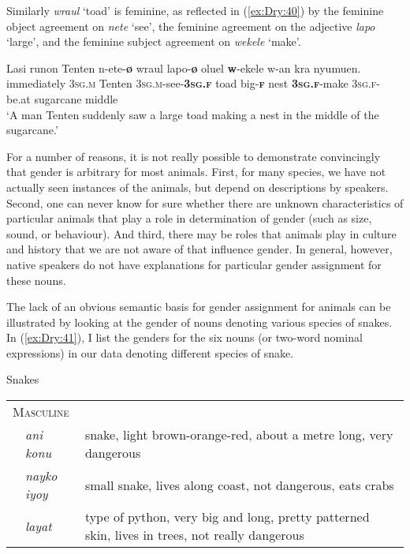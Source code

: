 \documentclass[output=collectionpaper]{langsci/langscibook}
\begin{document}
Similarly \textit{wraul} `toad' is feminine, as reflected in (\ref{ex:Dry:40}) by the feminine object agreement on \textit{nete} `see', the feminine agreement on the adjective \textit{lapo} `large', and the feminine subject agreement on \textit{wekele} `make'.

\ea \label{ex:Dry:40}
\gll Lasi	runon	Tenten	n-ete-\textbf{ø}	wraul lapo-\textbf{ø}	oluel	\textbf{w}-ekele	w-an kra	nyumuen.\\
immediately \textsc{3sg.m} Tenten \textsc{3sg.m}-see-\textbf{\textsc{3sg.f}} toad big-\textbf{\textsc{f}} nest \textbf{\textsc{3sg.f}}-make \textsc{3sg.f}-be.at sugarcane middle\\
\glt  `A man Tenten suddenly saw a large toad making a nest in the middle of the sugarcane.'
\z

For a number of reasons, it is not really possible to demonstrate convincingly that gender is arbitrary for most animals. First, for many species, we have not actually seen instances of the animals, but depend on descriptions by speakers. Second, one can never know for sure whether there are unknown characteristics of particular animals that play a role in determination of gender (such as size, sound, or behaviour). And third, there may be roles that animals play in  culture and history that we are not aware of that influence gender. In general, however, native speakers do not have explanations for particular gender assignment for these nouns.

The lack of an obvious semantic basis for gender assignment for animals can be illustrated by looking at the gender of nouns denoting various species of snakes. In (\ref{ex:Dry:41}), I list the genders for the six nouns (or two-word nominal expressions) in our data denoting different species of snake.

\ea   \label{ex:Dry:41}
Snakes

\begin{tabularx}{0.9\textwidth}{lp{1.8cm}X}
\multicolumn{3}{l}{\textsc{Masculine}} \\
& \textit{ani konu} & snake, light brown-orange-red, about a metre long, very dangerous\\
& \textit{nayko iyoy} & small snake, lives along coast, not dangerous, eats crabs\\
& \textit{layat} & type of python, very big and long, pretty patterned skin, lives in trees, not really dangerous\\
\end{tabularx}
\end{document}

